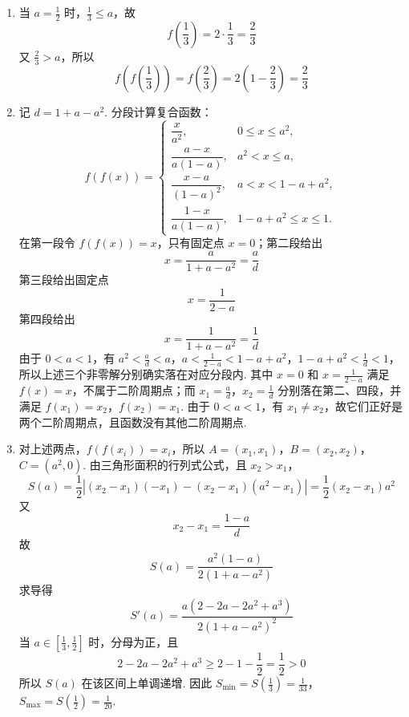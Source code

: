 \begin{solution}
\begin{enumerate}
\item 当 \(a=\frac12\) 时，\(\frac13\leqslant a\)，故
\[
f\left(\frac13\right)=2\cdot\frac13=\frac23
\]
又 \(\frac23>a\)，所以
\[
f\left(f\left(\frac13\right)\right)=f\left(\frac23\right)=2\left(1-\frac23\right)=\frac23
\]
\item 记 \(d=1+a-a^{2}\). 分段计算复合函数：
\[
f(f(x))=
\begin{cases}
\dfrac{x}{a^{2}},&0\leqslant x\leqslant a^{2},\\[4pt]
\dfrac{a-x}{a(1-a)},&a^{2}<x\leqslant a,\\[4pt]
\dfrac{x-a}{(1-a)^{2}},&a<x<1-a+a^{2},\\[4pt]
\dfrac{1-x}{a(1-a)},&1-a+a^{2}\leqslant x\leqslant1.
\end{cases}
\]
在第一段令 \(f(f(x))=x\)，只有固定点 \(x=0\)；第二段给出
\[
x=\frac{a}{1+a-a^{2}}=\frac ad
\]
第三段给出固定点
\[
x=\frac{1}{2-a}
\]
第四段给出
\[
x=\frac{1}{1+a-a^{2}}=\frac1d
\]
由于 \(0<a<1\)，有
\(a^{2}<\frac ad<a\)，\(a<\frac1{2-a}<1-a+a^{2}\)，\(1-a+a^{2}<\frac1d<1\)，
所以上述三个非零解分别确实落在对应分段内. 其中 \(x=0\) 和 \(x=\frac1{2-a}\) 满足 \(f(x)=x\)，不属于二阶周期点；而
\(x_1=\frac ad\)，\(x_2=\frac1d\)
分别落在第二、四段，并满足
\(f(x_1)=x_2\)，\(f(x_2)=x_1\).
由于 \(0<a<1\)，有 \(x_1\ne x_2\)，故它们正好是两个二阶周期点，且函数没有其他二阶周期点.
\item 对上述两点，\(f(f(x_i))=x_i\)，所以
\(A=(x_1,x_1)\)，\(B=(x_2,x_2)\)，\(C=(a^{2},0)\).
由三角形面积的行列式公式，且 \(x_2>x_1\)，
\[
S(a)=\frac12\left|(x_2-x_1)(-x_1)-(x_2-x_1)(a^{2}-x_1)\right|
 =\frac12(x_2-x_1)a^{2}
\]
又
\[
x_2-x_1=\frac{1-a}{d}
\]
故
\[
S(a)=\frac{a^{2}(1-a)}{2(1+a-a^{2})}
\]
求导得
\[
S'(a)=\frac{a(2-2a-2a^{2}+a^{3})}{2(1+a-a^{2})^{2}}
\]
当 \(a\in[\frac13,\frac12]\) 时，分母为正，且
\[
2-2a-2a^{2}+a^{3}\geqslant2-1-\frac12=\frac12>0
\]
所以 \(S(a)\) 在该区间上单调递增. 因此
\(S_{\min}=S\left(\frac13\right)=\frac1{33}\)，\(S_{\max}=S\left(\frac12\right)=\frac1{20}\).
\end{enumerate}
\end{solution}
